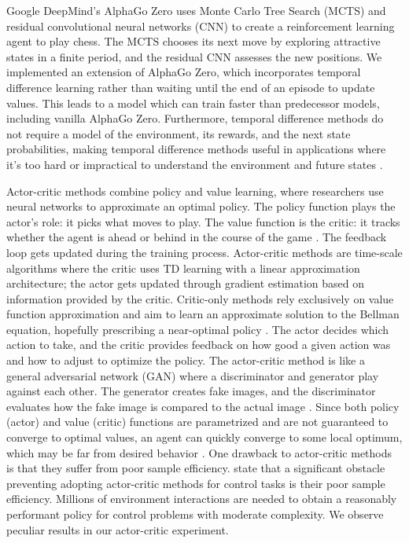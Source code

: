 \documentclass[12pt]{turabian-researchpaper}
\begin{document}
Google DeepMind’s AlphaGo Zero uses Monte Carlo Tree Search (MCTS) and residual convolutional neural networks (CNN) to create a reinforcement learning agent to play chess. The MCTS chooses its next move by exploring attractive states in a finite period, and the residual CNN assesses the new positions. We implemented an extension of AlphaGo Zero, which incorporates temporal difference learning rather than waiting until the end of an episode to update values. This leads to a model which can train faster than predecessor models, including vanilla AlphaGo Zero. Furthermore, temporal difference methods do not require a model of the environment, its rewards, and the next state probabilities, making temporal difference methods useful in applications where it’s too hard or impractical to understand the environment and future states \parencite{sutton1988learning}.

Actor-critic methods combine policy and value learning, where researchers use neural networks to approximate an optimal policy.  The policy function plays the actor's role: it picks what moves to play. The value function is the critic: it tracks whether the agent is ahead or behind in the course of the game \parencite{pumperla_chapter_2019}. The feedback loop gets updated during the training process. Actor-critic methods are time-scale algorithms where the critic uses TD learning with a linear approximation architecture; the actor gets updated through gradient estimation based on information provided by the critic. Critic-only methods rely exclusively on value function approximation and aim to learn an approximate solution to the Bellman equation, hopefully prescribing a near-optimal policy \parencite{konda_actor-critic_2000}. The actor decides which action to take, and the critic provides feedback on how good a given action was and how to adjust to optimize the policy. The actor-critic method is like a general adversarial network (GAN) where a discriminator and generator play against each other. The generator creates fake images, and the discriminator evaluates how the fake image is compared to the actual image \parencite{karunakaran_actor-critic_2020}. Since both policy (actor) and value (critic) functions are parametrized and are not guaranteed to converge to optimal values, an agent can quickly converge to some local optimum, which may be far from desired behavior \parencite{ring_replicating_nodate}. One drawback to actor-critic methods is that they suffer from poor sample efficiency. \Textcite{andrychowicz_what_2020} state that a significant obstacle preventing adopting actor-critic methods for control tasks is their poor sample efficiency. Millions of environment interactions are needed to obtain a reasonably performant policy for control problems with moderate complexity. We observe peculiar results in our actor-critic experiment.
\end{document}
